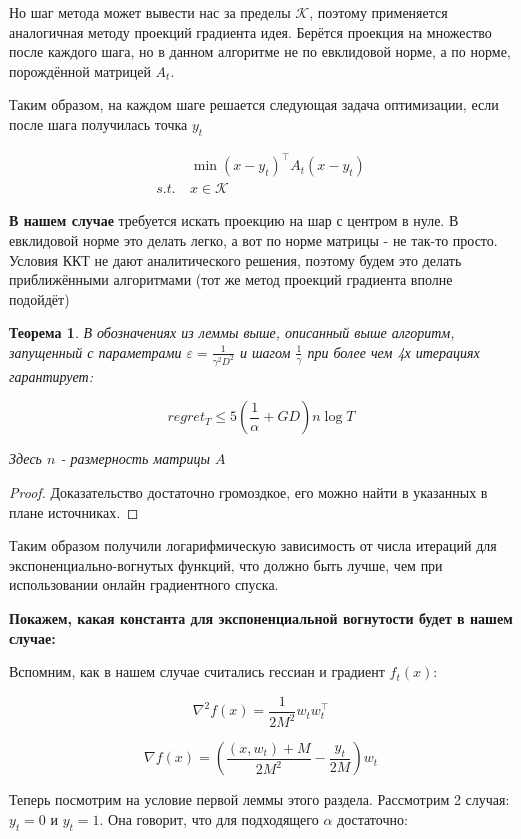 \documentclass[12pt]{article}
\newtheorem*{theorem}{Теорема}
\theoremstyle{definition}
\begin{document}
Но шаг метода может вывести нас за пределы $\mathcal{K}$, поэтому применяется аналогичная методу проекций градиента идея. Берётся проекция на множество после каждого шага, но в данном алгоритме не по евклидовой норме, а по норме, порождённой матрицей $A_t$.

Таким образом, на каждом шаге решается следующая задача оптимизации, если после шага получилась точка $y_t$

\begin{align*}
&\min (x - y_t)^\top A_t(x - y_t) \\
s.t.\ & x \in \mathcal{K}
\end{align*}

\textbf{В нашем случае} требуется искать проекцию на шар с центром в нуле. В евклидовой норме это делать легко, а вот по норме матрицы - не так-то просто. Условия ККТ не дают аналитического решения, поэтому будем это делать приближёнными алгоритмами (тот же метод проекций градиента вполне подойдёт)

\begin{theorem}
В обозначениях из леммы выше, описанный выше алгоритм, запущенный с параметрами $\varepsilon = \frac{1}{\gamma^2 D^2}$ и шагом $\frac{1}{\gamma}$ при более чем 4х итерациях гарантирует:

$$ regret_T \leqslant 5(\frac{1}{\alpha} + GD) n \log T $$

Здесь $n$ - размерность матрицы $A$
\end{theorem}
	
\begin{proof}
	Доказательство достаточно громоздкое, его можно найти в указанных в плане источниках.
\end{proof}

Таким образом получили логарифмическую зависимость от числа итераций для экспоненциально-вогнутых функций, что должно быть лучше, чем при использовании онлайн градиентного спуска.

\bigskip
\textbf{Покажем, какая константа для экспоненциальной вогнутости будет в нашем случае:}

Вспомним, как в нашем случае считались гессиан и градиент $f_t(x)$:

$$ \nabla^2 f(x) = \frac{1}{2M^2} w_t w_t^\top $$

$$ \nabla f(x) = \left(\frac{(x, w_t) + M}{2M^2} - \frac{y_t}{2M}\right) w_t $$

Теперь посмотрим на условие первой леммы этого раздела. Рассмотрим 2 случая: $y_t = 0$ и $y_t = 1$. Она говорит, что для подходящего $\alpha$ достаточно:
\end{document}

